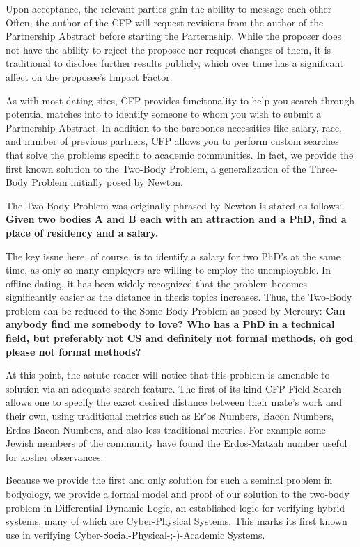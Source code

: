 \documentclass{article}
\begin{document}
Upon acceptance, the relevant parties gain the ability to message each other
Often, the author of the CFP will request revisions from the author of the Partnership Abstract before starting the Parternship.
While the proposer does not have the ability to reject the proposee nor request changes of them, it is traditional to disclose further results publicly, which over time has a significant affect on the proposee's Impact Factor.

As with most dating sites, CFP provides funcitonality to help you search through potential matches into to identify someone to whom you wish to submit a Partnership Abstract. In addition to the barebones necessities like salary, race, and number of previous partners, CFP allows you to perform custom searches that solve the problems specific to academic communities. In fact, we provide the first known solution to the Two-Body Problem, a generalization of the Three-Body Problem initially posed by Newton.

The Two-Body Problem was originally phrased by Newton is stated as follows:
\textbf{Given two bodies A and B each with an attraction and a PhD, find a place of residency and a salary.}

The key issue here, of course, is to identify a salary for two PhD's at the same time, as only so many employers are willing to employ the unemployable.
In offline dating, it has been widely recognized that the problem becomes significantly easier as the distance in thesis topics increases.
Thus, the Two-Body problem can be reduced to the Some-Body Problem as posed by Mercury:
\textbf{Can anybody find me somebody to love? Who has a PhD in a technical field, but preferably not CS and definitely not formal methods, oh god please not formal methods?}

At this point, the astute reader will notice that this problem is amenable to solution via an adequate search feature.
The first-of-its-kind CFP Field Search allows one to specify the exact desired distance between their mate's work and their own, using traditional metrics such as Er\''os Numbers, Bacon Numbers, Erdos-Bacon Numbers, and also less traditional metrics. For example some Jewish members of the community have found the Erdos-Matzah number useful for kosher observances.

Because we provide the first and only solution for such a seminal problem in bodyology, we provide a formal model and proof of our solution to the two-body problem in Differential Dynamic Logic, an established logic for verifying hybrid systems, many of which are Cyber-Physical Systems.
This marks its first known use in verifying Cyber-Social-Physical-;-)-Academic Systems.
\end{document}
